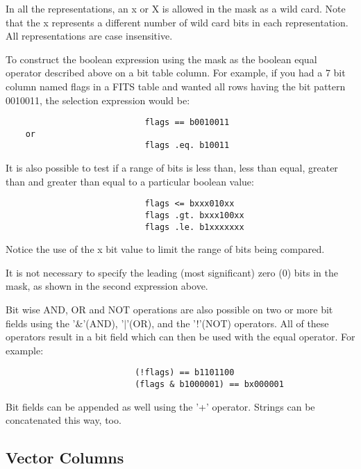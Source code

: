 \documentclass[11pt]{book}
\begin{document}
    In  all  the  representations, an x or X is allowed in the mask as a
    wild card. Note that the x represents a  different  number  of  wild
    card  bits  in  each  representation.  All  representations are case
    insensitive.

    To construct the boolean expression using the mask  as  the  boolean
    equal  operator  described above on a bit table column. For example,
    if you had a 7 bit column named flags in a  FITS  table  and  wanted
    all  rows  having  the bit pattern 0010011, the selection expression
    would be:


\begin{verbatim}
                            flags == b0010011
    or
                            flags .eq. b10011
\end{verbatim}

    It is also possible to test if a range of bits is  less  than,  less
    than  equal,  greater  than  and  greater than equal to a particular
    boolean value:


\begin{verbatim}
                            flags <= bxxx010xx
                            flags .gt. bxxx100xx
                            flags .le. b1xxxxxxx
\end{verbatim}

    Notice the use of the x bit value to limit the range of  bits  being
    compared.

    It  is  not necessary to specify the leading (most significant) zero
    (0) bits in the mask, as shown in the second expression above.

    Bit wise AND, OR and NOT operations are  also  possible  on  two  or
    more  bit  fields  using  the  '\&'(AND),  '$|$'(OR),  and the '!'(NOT)
    operators. All of these operators result in a bit  field  which  can
    then be used with the equal operator. For example:


\begin{verbatim}
                          (!flags) == b1101100
                          (flags & b1000001) == bx000001
\end{verbatim}

    Bit  fields can be appended as well using the '+' operator.  Strings
    can be concatenated this way, too.


\subsection{Vector Columns}
\end{document}
